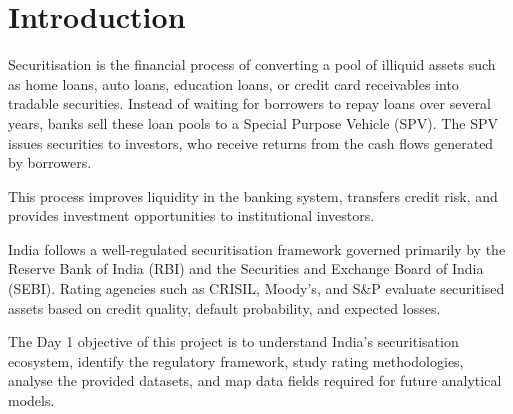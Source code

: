 \section{Introduction}

Securitisation is the financial process of converting a pool of illiquid assets such as home loans, auto loans, education loans, or credit card receivables into tradable securities. Instead of waiting for borrowers to repay loans over several years, banks sell these loan pools to a Special Purpose Vehicle (SPV). The SPV issues securities to investors, who receive returns from the cash flows generated by borrowers.

This process improves liquidity in the banking system, transfers credit risk, and provides investment opportunities to institutional investors.

India follows a well-regulated securitisation framework governed primarily by the Reserve Bank of India (RBI) and the Securities and Exchange Board of India (SEBI). Rating agencies such as CRISIL, Moody's, and S\&P evaluate securitised assets based on credit quality, default probability, and expected losses.

The Day 1 objective of this project is to understand India's securitisation ecosystem, identify the regulatory framework, study rating methodologies, analyse the provided datasets, and map data fields required for future analytical models.